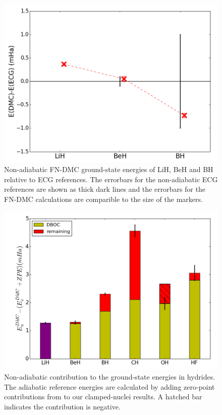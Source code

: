 \documentclass[pra,superscriptaddress,groupedaddress,twocolumn]{revtex4}
\begin{document}
\begin{figure}[h]
\centering
\includegraphics[scale=.37]{Figures/dia-ECG}
\caption{Non-adiabatic FN-DMC ground-state energies of LiH, BeH and BH relative to ECG references. The errorbars for the non-adiabatic ECG references are shown as thick dark lines and the errorbars for the FN-DMC calculations are comparible to the size of the markers. \label{fig:dia-ECG}}
\end{figure}

\begin{figure}[h]
\includegraphics[scale=.37]{Figures/dia-nad-ad}
\caption{Non-adiabatic contribution to the ground-state energies in hydrides. The adiabatic reference energies are calculated by adding zero-point contributions from \cite{Feller_Corrections} to our clamped-nuclei results. A hatched bar indicates the contribution is negative. \label{fig:dia-nad-ad}}
\end{figure}
\end{document}
